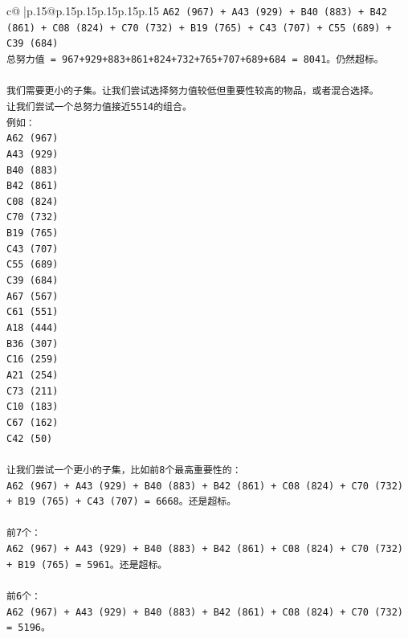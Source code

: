 \documentclass{article}
\begin{document}
{\begin{supertabular}{c@{$\;$}|p{.15\linewidth}@{}p{.15\linewidth}p{.15\linewidth}p{.15\linewidth}p{.15\linewidth}p{.15\linewidth}}
{{{\texttt{A62 (967) + A43 (929) + B40 (883) + B42 (861) + C08 (824) + C70 (732) + B19 (765) + C43 (707) + C55 (689) + C39 (684)} \\
\texttt{总努力值 = 967+929+883+861+824+732+765+707+689+684 = 8041。仍然超标。} \\
\\ 
\texttt{我们需要更小的子集。让我们尝试选择努力值较低但重要性较高的物品，或者混合选择。} \\
\texttt{让我们尝试一个总努力值接近5514的组合。} \\
\texttt{例如：} \\
\texttt{A62 (967)} \\
\texttt{A43 (929)} \\
\texttt{B40 (883)} \\
\texttt{B42 (861)} \\
\texttt{C08 (824)} \\
\texttt{C70 (732)} \\
\texttt{B19 (765)} \\
\texttt{C43 (707)} \\
\texttt{C55 (689)} \\
\texttt{C39 (684)} \\
\texttt{A67 (567)} \\
\texttt{C61 (551)} \\
\texttt{A18 (444)} \\
\texttt{B36 (307)} \\
\texttt{C16 (259)} \\
\texttt{A21 (254)} \\
\texttt{C73 (211)} \\
\texttt{C10 (183)} \\
\texttt{C67 (162)} \\
\texttt{C42 (50)} \\
\\ 
\texttt{让我们尝试一个更小的子集，比如前8个最高重要性的：} \\
\texttt{A62 (967) + A43 (929) + B40 (883) + B42 (861) + C08 (824) + C70 (732) + B19 (765) + C43 (707) = 6668。还是超标。} \\
\\ 
\texttt{前7个：} \\
\texttt{A62 (967) + A43 (929) + B40 (883) + B42 (861) + C08 (824) + C70 (732) + B19 (765) = 5961。还是超标。} \\
\\ 
\texttt{前6个：} \\
\texttt{A62 (967) + A43 (929) + B40 (883) + B42 (861) + C08 (824) + C70 (732) = 5196。} \\
}}}
\end{supertabular}}
\end{document}
